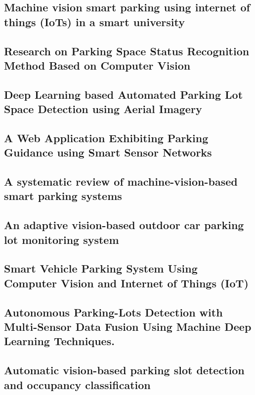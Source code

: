 \subsection{Machine vision smart parking using internet of things (IoTs) in a smart university}
\cite{sieck2020machine}

\subsection{Research on Parking Space Status Recognition Method Based on Computer Vision}
\cite{li2022research}

\subsection{Deep Learning based Automated Parking Lot Space Detection using Aerial Imagery}
\cite{gopinath2023deep}

\subsection{A Web Application Exhibiting Parking Guidance using Smart Sensor Networks}
\cite{sivakumar2020web}

\subsection{A systematic review of machine-vision-based smart parking systems}
\cite{abidin2020systematic}

\subsection{An adaptive vision-based outdoor car parking lot monitoring system}
\cite{nguyen2021adaptive}

\subsection{Smart Vehicle Parking System Using Computer Vision and Internet of Things (IoT)}
\cite{taylor2021smart}

\subsection{Autonomous Parking-Lots Detection with Multi-Sensor Data Fusion Using Machine Deep Learning Techniques.}
\cite{iqbal2021autonomous}

\subsection{Automatic vision-based parking slot detection and occupancy classification}
\cite{grbic2023automatic}
